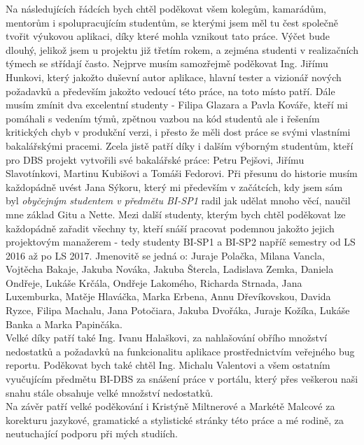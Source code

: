 Na následujících řádcích bych chtěl poděkovat všem kolegům, kamarádům, mentorům i spolupracujícím studentům, se kterými jsem měl tu čest společně tvořit výukovou aplikaci, díky které mohla vznikout tato práce. Výčet bude dlouhý, jelikož jsem u projektu již třetím rokem, a zejména studenti v realizačních týmech se střídají často. Nejprve musím samozřejmě poděkovat Ing. Jiřímu Hunkovi, který jakožto duševní autor aplikace, hlavní tester a vizionář nových požadavků a především jakožto vedoucí této práce, na toto místo patří. Dále musím zmínit dva excelentní studenty - Filipa Glazara a Pavla Kováře, kteří mi pomáhali s vedením týmů, zpětnou vazbou na kód studentů ale i řešením kritických chyb v produkční verzi, i přesto že měli dost práce se svými vlastními bakalářskými pracemi. Zcela jistě patří díky i dalším výborným studentům, kteří pro DBS projekt vytvořili své bakalářské práce: Petru Pejšovi, Jiřímu Slavotínkovi, Martinu Kubišovi a Tomáši Fedorovi.
Při přesunu do historie musím každopádně uvést Jana Sýkoru, který mi především v začátcích, kdy jsem sám byl \emph{obyčejným studentem v předmětu BI-SP1} radil jak udělat mnoho věcí, naučil mne základ Gitu a Nette. Mezi další studenty, kterým bych chtěl poděkovat lze každopádně zařadit všechny ty, kteří snáší pracovat podemnou jakožto jejich projektovým manažerem - tedy studenty BI-SP1 a BI-SP2 napříč semestry od LS 2016 až po LS 2017. Jmenovitě se jedná o: Juraje Polačka, Milana Vancla, Vojtěcha Bakaje, Jakuba Nováka, Jakuba Štercla, Ladislava Zemka, Daniela Ondřeje, Lukáše Krčála, Ondřeje Lakomého, Richarda Strnada, Jana Luxemburka, Matěje Hlaváčka, Marka Erbena, Annu Dřevíkovskou, Davida Ryzce, Filipa Machalu, Jana Potočiara, Jakuba Dvořáka, Juraje Kožíka, Lukáše Banka a Marka Papinčáka.\\
Velké díky patří také Ing. Ivanu Halaškovi, za nahlašování obřího množství nedostatků a požadavků na funkcionalitu aplikace prostřednictvím veřejného bug reportu. Poděkovat bych také chtěl Ing. Michalu Valentovi a všem ostatním vyučujícím předmětu BI-DBS za snášení práce v portálu, který přes veškerou naši snahu stále obsahuje velké množství nedostatků.\\
Na závěr patří velké poděkování i Kristýně Miltnerové a Markétě Malcové za korekturu jazykové, gramatické a stylistické stránky této práce a mé rodině, za neutuchající podporu při mých studiích.